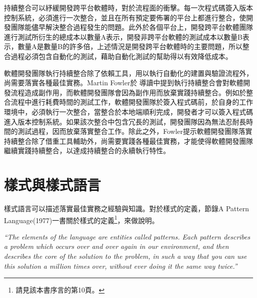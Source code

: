 持續整合可以紓緩開發跨平台軟體時，對於流程面的衝擊。每一次程式碼簽入版本控制系統，必須進行一次整合，並且在所有預定要佈署的平台上都進行整合，使開發團隊能儘早解決整合過程發生的問題。此外於各個平台上，開發跨平台軟體團隊進行測試所衍生的總成本以數量A表示，開發非跨平台軟體的測試成本以數量B表示，數量A是數量B的許多倍，上述情況是開發跨平台軟體時的主要問題，所以整合過程必須包含自動化的測試，藉助自動化測試的幫助得以有效降低成本。

軟體開發團隊執行持續整合除了依賴工具，用以執行自動化的建置與驗證流程外，尚需要落實各種最佳實務。Martin Fowler於\cite{continuousintegration2007} \textendash\hspace{3pt}導讀中提到執行持續整合會對軟體開發流程造成副作用，而軟體開發團隊會因為副作用而放棄實踐持續整合。例如於整合流程中進行耗費時間的測試工作，軟體開發團隊於簽入程式碼前，於自身的工作環境中，必須執行一次整合，當整合於本地端順利完成，開發者才可以簽入程式碼進入版本控制系統。如果該次整合中包含冗長的測試，開發團隊因為無法忍耐長時間的測試過程，因而放棄落實整合工作。除此之外，Fowler提示軟體開發團隊落實持續整合除了借重工具輔助外，尚需要實踐各種最佳實務，才能使得軟體開發團隊繼續實踐持續整合，以達成持續整合的永續執行特性。


\section{樣式與樣式語言}

樣式語言可以描述落實最佳實務之經驗與知識。對於樣式的定義，節錄A Pattern Language(1977)\cite{apatternlanguage}一書關於樣式的定義\footnote{請見該本書序言的第10頁。}，來做說明。

\textit{“The elements of the language are entities called patterns. Each pattern describes a problem which occurs over and over again in our environment, and then describes the core of the solution to the problem, in such a way that you can use this solution a million times over, without ever doing it the same way twice.”}

